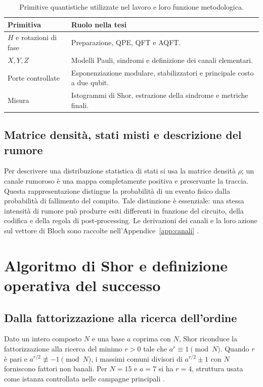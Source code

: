 \begin{table}[!htbp]
\centering
\small
\caption{Primitive quantistiche utilizzate nel lavoro e loro funzione metodologica.}\label{tab:finale_3_1}
\begin{tabularx}{\textwidth}{@{}lX@{}}
\toprule
\textbf{Primitiva} & \textbf{Ruolo nella tesi} \\
\midrule
$H$ e rotazioni di fase & Preparazione, QPE, QFT e AQFT. \\
$X,Y,Z$ & Modelli Pauli, sindromi e definizione dei canali elementari. \\
Porte controllate & Esponenziazione modulare, stabilizzatori e principale costo a due qubit. \\
Misura & Istogrammi di Shor, estrazione della sindrome e metriche finali. \\
\bottomrule
\end{tabularx}
\end{table}

\subsection{Matrice densità, stati misti e descrizione del rumore}\label{sec:finale_3_1_3}

Per descrivere una distribuzione statistica di stati si usa la matrice densità $\rho$; un canale rumoroso è una mappa completamente positiva e preservante la traccia. Questa rappresentazione distingue la probabilità di un evento fisico dalla probabilità di fallimento del compito. Tale distinzione è essenziale: una stessa intensità di rumore può produrre esiti differenti in funzione del circuito, della codifica e della regola di post-processing. Le derivazioni dei canali e la loro azione sul vettore di Bloch sono raccolte nell'Appendice~\ref{app:canali} \cite{nielsenChuang2000,zurek2003}.

\section{Algoritmo di Shor e definizione operativa del successo}\label{sec:finale_3_2}

\subsection{Dalla fattorizzazione alla ricerca dell'ordine}\label{sec:finale_3_2_1}

Dato un intero composto $N$ e una base $a$ coprima con $N$, Shor riconduce la fattorizzazione alla ricerca del minimo $r>0$ tale che $a^r\equiv1\pmod N$. Quando $r$ è pari e $a^{r/2}\not\equiv-1\pmod N$, i massimi comuni divisori di $a^{r/2}\pm1$ con $N$ forniscono fattori non banali. Per $N=15$ e $a=7$ si ha $r=4$, struttura usata come istanza controllata nelle campagne principali \cite{shor1994,nielsenChuang2000}.

